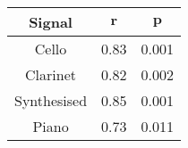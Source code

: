 \begin{tabular}{|c|c|c|}
	\hline
	\bf{Signal} & $\boldsymbol{r}$ & $\boldsymbol{p}$ \tabularnewline
	\hline
	\hline
	Cello & 0.83 & 0.001 \tabularnewline
	\hline
	Clarinet & 0.82 & 0.002 \tabularnewline
	\hline
	Synthesised & 0.85 & 0.001 \tabularnewline
	\hline
	Piano & 0.73 & 0.011 \tabularnewline
	\hline
\end{tabular}

